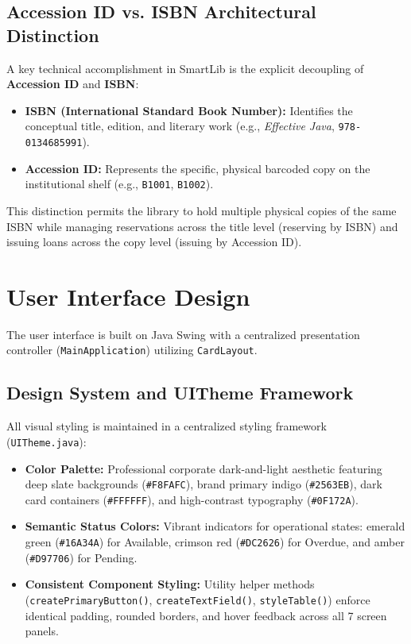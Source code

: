 \subsection{Accession ID vs. ISBN Architectural Distinction}
A key technical accomplishment in SmartLib is the explicit decoupling of \textbf{Accession ID} and \textbf{ISBN}:
\begin{itemize}
    \item \textbf{ISBN (International Standard Book Number):} Identifies the conceptual title, edition, and literary work (e.g., \textit{Effective Java}, \texttt{978-0134685991}).
    \item \textbf{Accession ID:} Represents the specific, physical barcoded copy on the institutional shelf (e.g., \texttt{B1001}, \texttt{B1002}).
\end{itemize}
This distinction permits the library to hold multiple physical copies of the same ISBN while managing reservations across the title level (reserving by ISBN) and issuing loans across the copy level (issuing by Accession ID).

\section{User Interface Design}
The user interface is built on Java Swing with a centralized presentation controller (\texttt{MainApplication}) utilizing \texttt{CardLayout}.

\subsection{Design System and UITheme Framework}
All visual styling is maintained in a centralized styling framework (\texttt{UITheme.java}):
\begin{itemize}
    \item \textbf{Color Palette:} Professional corporate dark-and-light aesthetic featuring deep slate backgrounds (\texttt{\#F8FAFC}), brand primary indigo (\texttt{\#2563EB}), dark card containers (\texttt{\#FFFFFF}), and high-contrast typography (\texttt{\#0F172A}).
    \item \textbf{Semantic Status Colors:} Vibrant indicators for operational states: emerald green (\texttt{\#16A34A}) for Available, crimson red (\texttt{\#DC2626}) for Overdue, and amber (\texttt{\#D97706}) for Pending.
    \item \textbf{Consistent Component Styling:} Utility helper methods (\texttt{createPrimaryButton()}, \texttt{createTextField()}, \texttt{styleTable()}) enforce identical padding, rounded borders, and hover feedback across all 7 screen panels.
\end{itemize}

